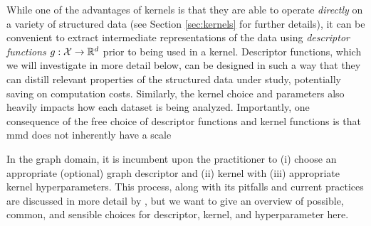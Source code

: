 While one of the advantages of kernels is that they are able to operate
\emph{directly} on a variety of structured data (see Section \ref{sec:kernels}
for further details), it can be convenient to extract intermediate
representations of the data using \emph{descriptor functions}
$g:\mathcal{X}\to\mathbb{R}^d$ prior to being used in a kernel. Descriptor functions,
which we will investigate in more detail below, can be designed in such a way
that they can distill relevant properties of the structured data under study,
potentially saving on computation costs. Similarly, the kernel choice and
parameters also heavily impacts how each dataset is being analyzed. Importantly,
one consequence of the free choice of descriptor functions and kernel functions is
that \acrshort{mmd} does not inherently have a scale \citep{obray2022evaluation}

In the graph domain, it is incumbent upon the practitioner to (i) choose an
appropriate (optional) graph descriptor and (ii) kernel with (iii) appropriate
kernel hyperparameters. This process, along with its pitfalls and current
practices are discussed in more detail by \cite{obray2022evaluation}, but we
want to give an overview of possible, common, and sensible choices for
descriptor, kernel, and hyperparameter here.

